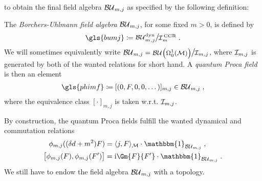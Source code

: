 to obtain the final field algebra ${\mathcal{BU}_{m,j}}$ as specified by the following definition:
\begin{definition}
The \emph{Borchers-Uhlmann field algebra} ${\mathcal{BU}_{m,j}}$, for some fixed $m>0$, is defined by
	\begin{align}
     \gls{bumj} \coloneqq {\Quotientscale{\BUmjdyn}{\IMCCR}} \formspace.
	\end{align}
We will sometimes equivalently write $\BUmj = {\Quotientscale{\BUOmega}{\IMJ}}$, where $\mathcal{I}_{m,j}$ is generated by both of the wanted relations for short hand.
A \emph{quantum Proca field} is then an element
\begin{align}
	\gls{phimf} \coloneqq [(0,F,0,0,\dots)]_{m,j} \in \BUmj \formspace,
\end{align}
where the equivalence class $[\cdot]_{m,j}$ is taken w.r.t. $\mathcal{I}_{m,j}$.
\end{definition}
By construction, the quantum Proca fields fulfill the wanted dynamical and commutation relations
\begin{align}
	\phi_{m,j}( (\delta d +m^2) F ) 				&= \langle j, F \rangle_\M \cdot \mathbbm{1}_{\BUmj} \formspace,\\
	\big[ \phi_{m,j}(F) , \phi_{m,j}(F') \big] 	   &= \i \Gm{F}{F'} \cdot  \mathbbm{1}_{\BUmj} \formspace.
\end{align}
We still have to endow the field algebra ${\mathcal{BU}_{m,j}}$ with a topology.
%
%
%
%
%

